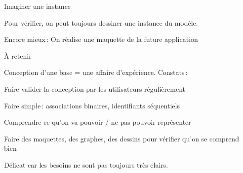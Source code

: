 \begin{frame}{Imaginer une instance}

Pour vérifier, on peut toujours dessiner une instance du modèle.

\vfill


\vfill


\alert{Encore mieux}\,: On réalise une maquette de la future application 


\end{frame}


\begin{frame}{À retenir}

Conception d'une base = une affaire d'expérience. Constats\,:

\vfill

\begin{redbullet}
\item Faire valider la conception par les utilisateurs régulièrement
  \item Faire simple\,: associations binaires, identifiants séquentiels
  \item Comprendre ce qu'on va pouvoir / ne pas pouvoir représenter
  \item Faire des maquettes, des graphes, des dessins pour vérifier qu'on se comprend bien
\end{redbullet}

\vfill

Délicat  car les besoins ne sont pas toujours très clairs.
\end{frame}

